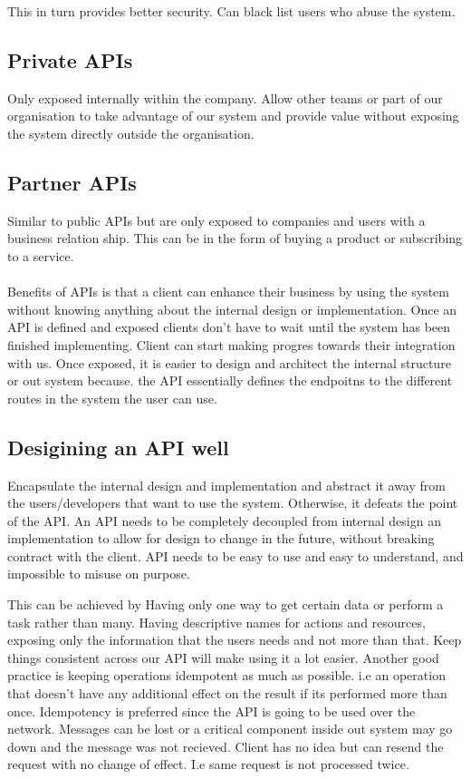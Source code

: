 \documentclass[a4paper, 11pt]{book}
\begin{document}
    This in turn provides better security. Can black list users who abuse the system.

    \subsection{Private APIs}
    Only exposed internally within the company.
    Allow other teams or part of our organisation to take advantage of our system and provide value without exposing the system directly outside the organisation.

    \subsection{Partner APIs}
    Similar to public APIs but are only exposed to companies and users with a business relation ship.
    This can be in the form of buying a product or subscribing to a service.

    \paragraph{}
    Benefits of APIs is that a client can enhance their business by using the system without knowing anything about the internal design or implementation.
    Once an API is defined and exposed clients don't have to wait until the system has been finished implementing.
    Client can start making progres towards their integration with us.
    Once exposed,
    it is easier to design and architect the internal structure or out system because.
    the API essentially defines the endpoitns to the different routes in the system the user can use.

    \subsection{Desigining an API well}
    Encapsulate the internal design and implementation and abstract it away from the users/developers that want to use the system.
    Otherwise, it defeats the point of the API.
    An API needs to be completely decoupled from internal design an implementation to allow for design to change in the future, without breaking contract with the client.
    API needs to be easy to use and easy to understand, and impossible to misuse on purpose.

    This can be achieved by
    Having only one way to get certain data or perform a task rather than many.
    Having descriptive names for actions and resources, exposing only the information that the users needs and not more than that.
    Keep things consistent across our API will make using it a lot easier.
    Another good practice is keeping operations idempotent as much as possible.
    i.e an operation that doesn't have any additional effect on the result if its performed more than once.
    Idempotency is preferred since the API is going to be used over the network.
    Messages can be lost or a critical component inside out system may go down and the message was not recieved.
    Client has no idea but can resend the request with no change of effect.
    I.e same request is not processed twice.
\end{document}

